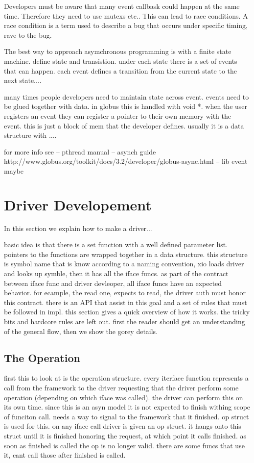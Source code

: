 \documentclass[11pt]{article}
\begin{document}
Developers must be aware that many event callbask could happen at the same
time.  Therefore they need to use mutexs etc..
This can lead to race conditions.  A race condition is a term
used to describe a bug that occurs under specific timing, rave to the
bug.

The best way to approach asymchronous programming is with a finite state
machine.  define state and transistion.  under each state there is 
a set of events that can happen.  each event defines a transition from
the current state to the next state....

many times people developers need to maintain state across event.  events
need to be glued together with data.  in globus this is handled with 
void *.  when the user registers an event they can register a pointer
to their own memory with the event.  this is just a block of mem that
the developer defines.  usually it is a data structure with ....

for more info see
-- pthread manual
-- asynch guide
    http://www.globus.org/toolkit/docs/3.2/developer/globus-async.html
-- lib event maybe


\section{Driver Developement}
In this section we explain how to make a driver...

basic idea is that there is a set function with a well defined parameter
list.  pointers to the functions are wrapped together in a data structure.
this structure is symbol name that is know according to a naming convention,
xio loads driver and looks up symble, then it has all the iface funcs.
as part of the contract between iface func and driver devleoper, all iface
funcs have an expected behavior.  for ecample, the read one, expects to read,
the driver auth must honor this contract.  there is an API that assist in this
goal and a set of rules that must be followed in impl.  this section
gives a quick overview of how it works.  the tricky bits and hardcore 
rules are left out.  first the reader should get an understanding of 
the general flow, then we show the gorey details.

\subsection{The Operation}
first this to look at is the operation structure.  every iterface function
represents a call from the framework to the driver requesting that the 
driver perform some operation (depending on which iface was called).  the 
driver can perform this on its own time.  since this is an asyn model it 
is not expected to finish withing scope of funciton call.  needs a way to 
signal to the framework that it finished.  op struct is used for this.
on any iface call driver is given an op struct.  it hangs onto this
struct until it is finished honoring the request, at which point it calls
finished.  as soon as finished is called the op is no longer valid.  there
are some funcs that use it, cant call those after finished is called.
\end{document}
